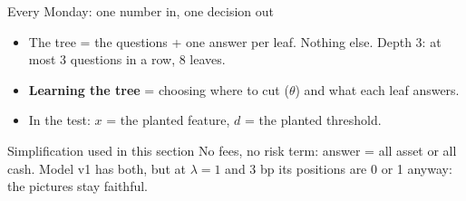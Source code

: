 \documentclass[10pt,aspectratio=169]{beamer}
\newcommand{\1}{\mathbf{1}}
\begin{document}
\begin{frame}{Every Monday: one number in, one decision out}
\begin{center}
\end{center}
\begin{itemize}
\item The tree = the questions + one answer per leaf. Nothing else. Depth 3: at most 3 questions in a row, 8 leaves.
\item \textbf{Learning the tree} = choosing where to cut ($\theta$) and what each leaf answers.
\item In the test: $x$ = the planted feature, $d$ = the planted threshold.
\end{itemize}
\medskip
\begin{block}{Simplification used in this section}
No fees, no risk term: answer = all asset or all cash. Model v1 has both, but at $\lambda=1$ and 3 bp its positions are 0 or 1 anyway: the pictures stay faithful.
\end{block}
\end{frame}
\end{document}
